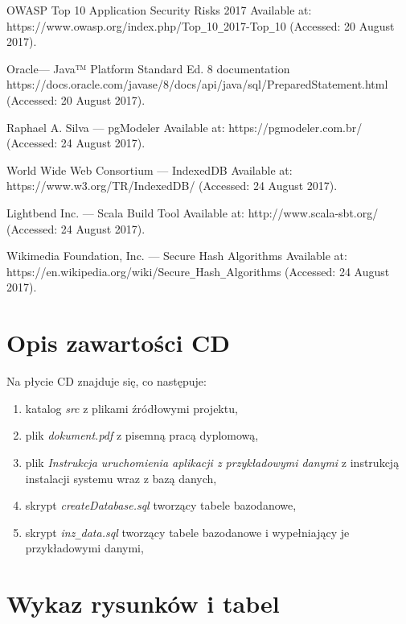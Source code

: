\documentclass[a4paper,12pt,twoside]{article}
\begin{document}
\begin{thebibliography}{99}
OWASP Top 10 Application Security Risks 2017 Available at:
https://www.owasp.org/index.php/Top\verb!_!10\verb!_!2017-Top\verb!_!10 (Accessed: 20 August 2017).

Oracle— Java™ Platform Standard Ed. 8 documentation
https://docs.oracle.com/javase/8/docs/api/java/sql/PreparedStatement.html (Accessed: 20 August 2017).

Raphael A. Silva — pgModeler Available at: https://pgmodeler.com.br/
(Accessed: 24 August 2017).

World Wide Web Consortium — IndexedDB Available at: https://www.w3.org/TR/IndexedDB/
(Accessed: 24 August 2017).

Lightbend Inc. — Scala Build Tool
Available at: http://www.scala-sbt.org/
(Accessed: 24 August 2017).

Wikimedia Foundation, Inc. — Secure Hash Algorithms
Available at: https://en.wikipedia.org/wiki/Secure\verb!_!Hash\verb!_!Algorithms
(Accessed: 24 August 2017).
\end{thebibliography}

\newpage
\section*{Opis zawartości CD}

Na płycie CD znajduje się, co następuje:
\begin{enumerate}[1)]
\item katalog \textit{src} z plikami źródłowymi projektu,
\item plik \textit{dokument.pdf} z pisemną pracą dyplomową,
\item plik \textit{Instrukcja uruchomienia aplikacji z przykładowymi danymi} z instrukcją instalacji systemu wraz z bazą danych,
\item skrypt \textit{createDatabase.sql} tworzący tabele bazodanowe,
\item skrypt \textit{inz}\verb!_!\textit{data.sql} tworzący tabele bazodanowe i wypełniający je przykładowymi danymi,
\end{enumerate}

\newpage
\section*{Wykaz rysunków i tabel}
\listoffigures
\listoftables
\end{document}
